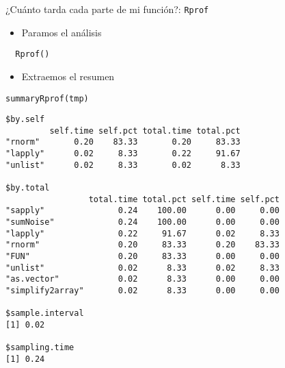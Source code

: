 \documentclass[xcolor={usenames,svgnames,dvipsnames}]{beamer}
\begin{document}
\begin{frame}[fragile,label={sec:orgheadline26}]{¿Cuánto tarda cada parte de mi función?: \texttt{Rprof}}
 \begin{itemize}
\item Paramos el análisis
\end{itemize}
\lstset{language=R,label= ,caption= ,captionpos=b,numbers=none}
\begin{lstlisting}
  Rprof()
\end{lstlisting}

\begin{itemize}
\item Extraemos el resumen
\end{itemize}
\lstset{language=R,label= ,caption= ,captionpos=b,numbers=none}
\begin{lstlisting}
summaryRprof(tmp)
\end{lstlisting}

\begin{verbatim}
$by.self
         self.time self.pct total.time total.pct
"rnorm"       0.20    83.33       0.20     83.33
"lapply"      0.02     8.33       0.22     91.67
"unlist"      0.02     8.33       0.02      8.33

$by.total
                 total.time total.pct self.time self.pct
"sapply"               0.24    100.00      0.00     0.00
"sumNoise"             0.24    100.00      0.00     0.00
"lapply"               0.22     91.67      0.02     8.33
"rnorm"                0.20     83.33      0.20    83.33
"FUN"                  0.20     83.33      0.00     0.00
"unlist"               0.02      8.33      0.02     8.33
"as.vector"            0.02      8.33      0.00     0.00
"simplify2array"       0.02      8.33      0.00     0.00

$sample.interval
[1] 0.02

$sampling.time
[1] 0.24
\end{verbatim}
\end{frame}
\end{document}
